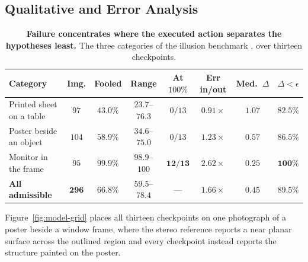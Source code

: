 \documentclass{article} %
\theoremstyle{defstyle}
\theoremstyle{plain}
\begin{document}
\subsection{Qualitative and Error Analysis}
\label{sec:res-qualitative}
\begin{table}[t]
\caption{\textbf{Failure concentrates where the executed action separates the hypotheses least.} The
three categories of the illusion benchmark \citep{illusion2025}, over thirteen checkpoints.}
\label{tab:category}
\begin{center}
\footnotesize
\setlength{\tabcolsep}{4.2pt}
\begin{tabular}{lccccccc}
\toprule
\textbf{Category} & \textbf{Img.} & \textbf{Fooled} & \textbf{Range} &
\textbf{At $100\%$} & \textbf{Err in/out} & \textbf{Med.\ $\Delta$} &
\textbf{$\Delta < \epsilon$} \\
\midrule
Printed sheet on a table & $97$ & $43.0\%$ & $23.7$--$76.3$ & $0/13$ & $0.91\times$ & $1.07$ & $82.5\%$ \\
Poster beside an object & $104$ & $58.9\%$ & $34.6$--$75.0$ & $0/13$ & $1.23\times$ & $0.57$ & $86.5\%$ \\
Monitor in the frame & $95$ & $\mathbf{99.9\%}$ & $98.9$--$100$ & $\mathbf{12/13}$ & $2.62\times$ & $\mathbf{0.25}$ & $\mathbf{100\%}$ \\
\midrule
\textbf{All admissible} & $\mathbf{296}$ & $\mathbf{66.8\%}$ & $59.5$--$78.4$ & --- & $1.66\times$ & $0.45$ & $89.5\%$ \\
\bottomrule
\end{tabular}
\end{center}
\end{table}
Figure~\ref{fig:model-grid} places all thirteen checkpoints on one photograph of a poster
beside a window frame, where the stereo reference reports a near planar surface across the
outlined region and every checkpoint instead reports the structure painted on the poster.
\end{document}

